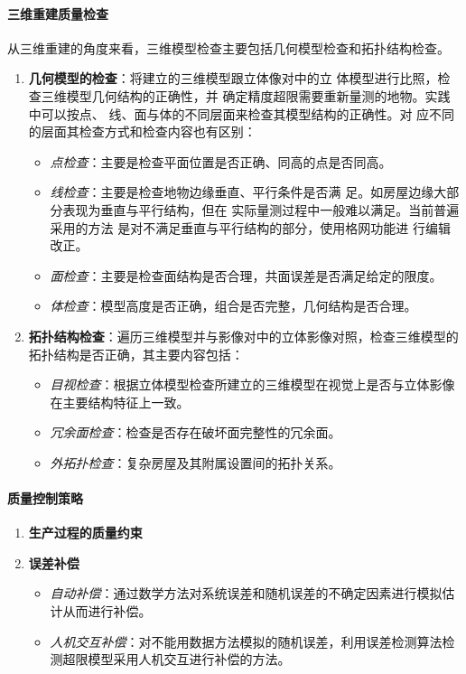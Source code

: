 \paragraph{三维重建质量检查}从三维重建的角度来看，三维模型检查主要包括几何模型检查和拓扑结构检查。
\begin{enumerate}
	\item \textbf{几何模型的检查}：将建立的三维模型跟立体像对中的立
		体模型进行比照，检查三维模型几何结构的正确性，并
		确定精度超限需要重新量测的地物。实践中可以按点、
		线、面与体的不同层面来检查其模型结构的正确性。对
		应不同的层面其检查方式和检查内容也有区别：
		\begin{itemize}
			\item \textit{点检查}：主要是检查平面位置是否正确、同高的点是否同高。
			\item \textit{线检查}：主要是检查地物边缘垂直、平行条件是否满
				足。如房屋边缘大部分表现为垂直与平行结构，但在
				实际量测过程中一般难以满足。当前普遍采用的方法
				是对不满足垂直与平行结构的部分，使用格网功能进
				行编辑改正。
			\item \textit{面检查}：主要是检查面结构是否合理，共面误差是否满足给定的限度。
			\item \textit{体检查}：模型高度是否正确，组合是否完整，几何结构是否合理。
		\end{itemize}
	\item \textbf{拓扑结构检查}：遍历三维模型并与影像对中的立体影像对照，检查三维模型的拓扑结构是否正确，其主要内容包括：
		\begin{itemize}
			\item \textit{目视检查}：根据立体模型检查所建立的三维模型在视觉上是否与立体影像在主要结构特征上一致。
			\item \textit{冗余面检查}：检查是否存在破坏面完整性的冗余面。
			\item \textit{外拓扑检查}：复杂房屋及其附属设置间的拓扑关系。
		\end{itemize}
\end{enumerate}

\paragraph{质量控制策略}
\begin{enumerate}
	\item \textbf{生产过程的质量约束}
	\item \textbf{误差补偿}
		\begin{itemize}
			\item \textit{自动补偿}：通过数学方法对系统误差和随机误差的不确定因素进行模拟估计从而进行补偿。
			\item \textit{人机交互补偿}：对不能用数据方法模拟的随机误差，利用误差检测算法检测超限模型采用人机交互进行补偿的方法。
		\end{itemize}
\end{enumerate}